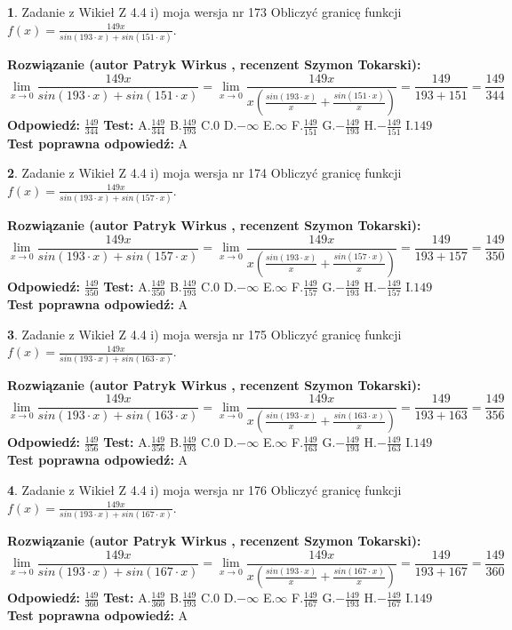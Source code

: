 \documentclass[12pt, a4paper]{article}
\theoremstyle{definition} %
\newtheorem{zad}{}
\newcommand{\zadStart}[1]{\begin{zad}#1\newline}
\newcommand{\zadStop}{\end{zad}}
\newcommand{\rozwStart}[2]{\noindent \textbf{Rozwiązanie (autor #1 , recenzent #2): }\newline}
\newcommand{\rozwStop}{\newline}
\newcommand{\odpStart}{\noindent \textbf{Odpowiedź:}\newline}
\newcommand{\odpStop}{\newline}
\newcommand{\testStart}{\noindent \textbf{Test:}\newline}
\newcommand{\testStop}{\newline}
\newcommand{\kluczStart}{\noindent \textbf{Test poprawna odpowiedź:}\newline}
\newcommand{\kluczStop}{\newline}
\begin{document}
\zadStart{Zadanie z Wikieł Z 4.4 i) moja wersja nr 173}
Obliczyć granicę funkcji $f(x)=\frac{149x}{sin(193\cdot x) +sin(151\cdot x)}$.
\zadStop
\rozwStart{Patryk Wirkus}{Szymon Tokarski}
$$\lim\limits_{x\to 0}\frac{149x}{sin(193\cdot x) +sin(151\cdot x)}=\lim\limits_{x\to 0}\frac{149x}{x(\frac{sin(193\cdot x)}{x}+\frac{sin(151\cdot x)}{x})}=\frac{149}{193+151} = \frac{149}{344}$$
\rozwStop
\odpStart
$\frac{149}{344}$
\odpStop
\testStart
A.$\frac{149}{344}$
B.$\frac{149}{193}$
C.$0$
D.$-\infty$
E.$\infty$
F.$\frac{149}{151}$
G.$-\frac{149}{193}$
H.$-\frac{149}{151}$
I.$149$
\testStop
\kluczStart
A
\kluczStop



\zadStart{Zadanie z Wikieł Z 4.4 i) moja wersja nr 174}
Obliczyć granicę funkcji $f(x)=\frac{149x}{sin(193\cdot x) +sin(157\cdot x)}$.
\zadStop
\rozwStart{Patryk Wirkus}{Szymon Tokarski}
$$\lim\limits_{x\to 0}\frac{149x}{sin(193\cdot x) +sin(157\cdot x)}=\lim\limits_{x\to 0}\frac{149x}{x(\frac{sin(193\cdot x)}{x}+\frac{sin(157\cdot x)}{x})}=\frac{149}{193+157} = \frac{149}{350}$$
\rozwStop
\odpStart
$\frac{149}{350}$
\odpStop
\testStart
A.$\frac{149}{350}$
B.$\frac{149}{193}$
C.$0$
D.$-\infty$
E.$\infty$
F.$\frac{149}{157}$
G.$-\frac{149}{193}$
H.$-\frac{149}{157}$
I.$149$
\testStop
\kluczStart
A
\kluczStop



\zadStart{Zadanie z Wikieł Z 4.4 i) moja wersja nr 175}
Obliczyć granicę funkcji $f(x)=\frac{149x}{sin(193\cdot x) +sin(163\cdot x)}$.
\zadStop
\rozwStart{Patryk Wirkus}{Szymon Tokarski}
$$\lim\limits_{x\to 0}\frac{149x}{sin(193\cdot x) +sin(163\cdot x)}=\lim\limits_{x\to 0}\frac{149x}{x(\frac{sin(193\cdot x)}{x}+\frac{sin(163\cdot x)}{x})}=\frac{149}{193+163} = \frac{149}{356}$$
\rozwStop
\odpStart
$\frac{149}{356}$
\odpStop
\testStart
A.$\frac{149}{356}$
B.$\frac{149}{193}$
C.$0$
D.$-\infty$
E.$\infty$
F.$\frac{149}{163}$
G.$-\frac{149}{193}$
H.$-\frac{149}{163}$
I.$149$
\testStop
\kluczStart
A
\kluczStop



\zadStart{Zadanie z Wikieł Z 4.4 i) moja wersja nr 176}
Obliczyć granicę funkcji $f(x)=\frac{149x}{sin(193\cdot x) +sin(167\cdot x)}$.
\zadStop
\rozwStart{Patryk Wirkus}{Szymon Tokarski}
$$\lim\limits_{x\to 0}\frac{149x}{sin(193\cdot x) +sin(167\cdot x)}=\lim\limits_{x\to 0}\frac{149x}{x(\frac{sin(193\cdot x)}{x}+\frac{sin(167\cdot x)}{x})}=\frac{149}{193+167} = \frac{149}{360}$$
\rozwStop
\odpStart
$\frac{149}{360}$
\odpStop
\testStart
A.$\frac{149}{360}$
B.$\frac{149}{193}$
C.$0$
D.$-\infty$
E.$\infty$
F.$\frac{149}{167}$
G.$-\frac{149}{193}$
H.$-\frac{149}{167}$
I.$149$
\testStop
\kluczStart
A
\kluczStop
\end{document}
